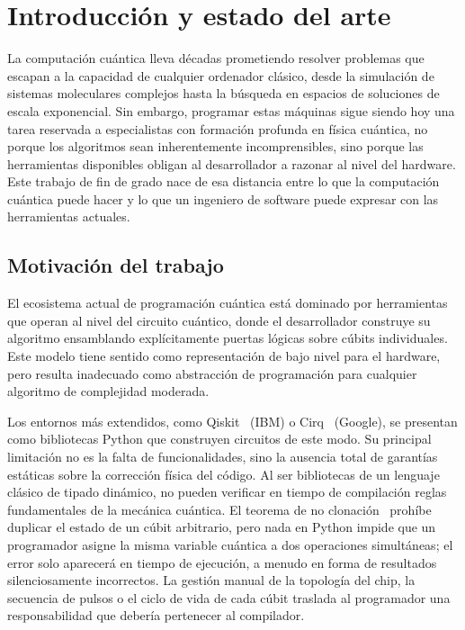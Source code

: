 \chapter{Introducción y estado del arte}
\label{ch:introduccion}

La computación cuántica lleva décadas prometiendo resolver problemas que escapan a la capacidad de cualquier ordenador clásico, desde la simulación de sistemas moleculares complejos hasta la búsqueda en espacios de soluciones de escala exponencial. Sin embargo, programar estas máquinas sigue siendo hoy una tarea reservada a especialistas con formación profunda en física cuántica, no porque los algoritmos sean inherentemente incomprensibles, sino porque las herramientas disponibles obligan al desarrollador a razonar al nivel del hardware. Este trabajo de fin de grado nace de esa distancia entre lo que la computación cuántica puede hacer y lo que un ingeniero de software puede expresar con las herramientas actuales.

\section{Motivación del trabajo}
\label{sec:motivacion}

El ecosistema actual de programación cuántica está dominado por herramientas que operan al nivel del circuito cuántico, donde el desarrollador construye su algoritmo ensamblando explícitamente puertas lógicas sobre cúbits individuales. Este modelo tiene sentido como representación de bajo nivel para el hardware, pero resulta inadecuado como abstracción de programación para cualquier algoritmo de complejidad moderada.

Los entornos más extendidos, como Qiskit~\cite{qiskit_2024} (IBM) o Cirq~\cite{cirq} (Google), se presentan como bibliotecas Python que construyen circuitos de este modo. Su principal limitación no es la falta de funcionalidades, sino la ausencia total de garantías estáticas sobre la corrección física del código. Al ser bibliotecas de un lenguaje clásico de tipado dinámico, no pueden verificar en tiempo de compilación reglas fundamentales de la mecánica cuántica. El teorema de no clonación~\cite{wootters_zurek_1982} prohíbe duplicar el estado de un cúbit arbitrario, pero nada en Python impide que un programador asigne la misma variable cuántica a dos operaciones simultáneas; el error solo aparecerá en tiempo de ejecución, a menudo en forma de resultados silenciosamente incorrectos. La gestión manual de la topología del chip, la secuencia de pulsos o el ciclo de vida de cada cúbit traslada al programador una responsabilidad que debería pertenecer al compilador.

